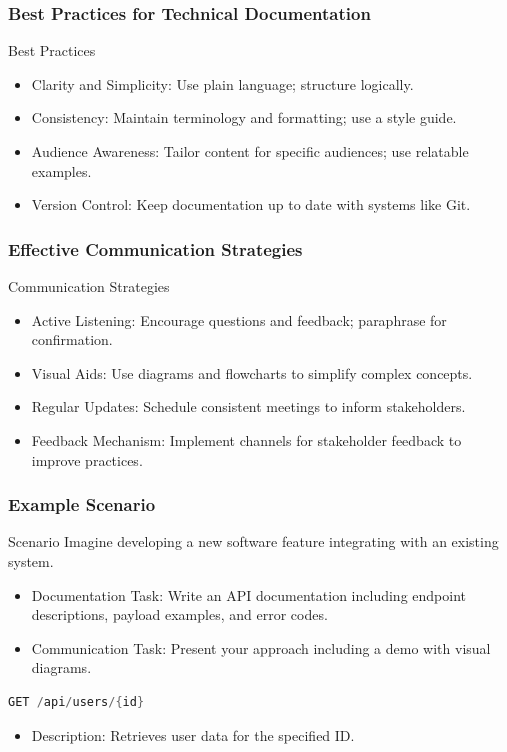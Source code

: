 \documentclass{beamer}
\begin{document}
\begin{frame}[fragile]
    \frametitle{Best Practices for Technical Documentation}
    \begin{block}{Best Practices}
        \begin{itemize}
            \item Clarity and Simplicity: Use plain language; structure logically.
            \item Consistency: Maintain terminology and formatting; use a style guide.
            \item Audience Awareness: Tailor content for specific audiences; use relatable examples.
            \item Version Control: Keep documentation up to date with systems like Git.
        \end{itemize}
    \end{block}
\end{frame}

\begin{frame}[fragile]
    \frametitle{Effective Communication Strategies}
    \begin{block}{Communication Strategies}
        \begin{itemize}
            \item Active Listening: Encourage questions and feedback; paraphrase for confirmation.
            \item Visual Aids: Use diagrams and flowcharts to simplify complex concepts.
            \item Regular Updates: Schedule consistent meetings to inform stakeholders.
            \item Feedback Mechanism: Implement channels for stakeholder feedback to improve practices.
        \end{itemize}
    \end{block}
\end{frame}

\begin{frame}[fragile]
    \frametitle{Example Scenario}
    \begin{block}{Scenario}
        Imagine developing a new software feature integrating with an existing system.
        \begin{itemize}
            \item Documentation Task: Write an API documentation including endpoint descriptions, payload examples, and error codes.
            \item Communication Task: Present your approach including a demo with visual diagrams.
        \end{itemize}
        \begin{lstlisting}[language=C]
GET /api/users/{id}
        \end{lstlisting}
        \begin{itemize}
            \item Description: Retrieves user data for the specified ID.
        \end{itemize}
    \end{block}
\end{frame}
\end{document}
